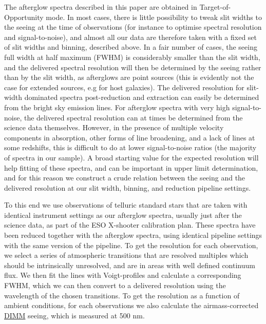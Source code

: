 \documentclass[longauth]{aa}    %
\begin{document}
The afterglow spectra described in this paper are obtained in
Target-of-Opportunity mode. In most cases, there is little possibility to tweak
slit widths to the seeing at the time of observations (for instance to optimise spectral
resolution and signal-to-noise), and almost all our data are therefore taken
with a fixed set of slit widths and binning, described above. In a fair number
of cases, the seeing full width at half maximum (FWHM) is considerably smaller
than the slit width, and the delivered spectral resolution will then be
determined by the seeing rather than by the slit width, as afterglows are point
sources (this is evidently not the case for extended sources, e.g for host
galaxies). The delivered resolution for slit-width dominated spectra
post-reduction and extraction can easily be determined from the bright sky
emission lines. For afterglow spectra with very high signal-to-noise, the
delivered spectral resolution can at times be determined from the science data
themselves. However, in the presence of multiple velocity components in
absorption, other forms of line broadening, and a lack of lines at some
redshifts, this is difficult to do at lower signal-to-noise ratios (the majority
of spectra in our sample). A broad starting value for the expected resolution
will help fitting of these spectra, and can be important in upper limit
determination, and for this reason we construct a crude relation between the
seeing and the delivered resolution at our slit width, binning, and reduction
pipeline settings.

To this end we use observations of telluric standard stars that are taken with
identical instrument settings as our afterglow spectra, usually just after the
science data, as part of the ESO X-shooter calibration plan. These spectra have
been reduced together with the afterglow spectra, using identical pipeline
settings with the same version of the pipeline. To get the resolution for each
observation, we select a series of atmospheric transitions that are resolved
multiples which should be intrinsically unresolved, and are in areas with well
defined continuum flux. We then fit the lines with Voigt-profiles and calculate
a corresponding FWHM, which we can then convert to a delivered resolution using
the wavelength of the chosen transitions. To get the resolution as a function of
ambient conditions, for each observations we also calculate the
airmass-corrected \href{http://www.eso.org/asm/ui/publicLog}{DIMM} seeing, which
is measured at 500 nm.
\end{document}
